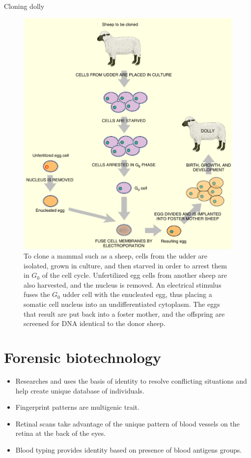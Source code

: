 \documentclass[
  ignorenonframetext,
  aspectratio=169]{beamer}
\providecommand{\tightlist}{%
  \setlength{\itemsep}{0pt}\setlength{\parskip}{0pt}}
\begin{document}
\begin{frame}{Cloning dolly}
\protect\hypertarget{cloning-dolly}{}
\begin{figure}
\includegraphics[width=0.38\linewidth]{../images/dolly_cloning} \caption{To clone a mammal such as a sheep, cells from the udder are isolated, grown in culture, and then starved in order to arrest them in $G_0$ of the cell cycle. Unfertilized egg cells from another sheep are also harvested, and the nucleus is removed. An electrical stimulus fuses the $G_0$ udder cell with the enucleated egg, thus placing a somatic cell nucleus into an undifferentiated cytoplasm. The eggs that result are put back into a foster mother, and the offspring are screened for DNA identical to the donor sheep.}\label{fig:dolly-sheep-cloning}
\end{figure}
\end{frame}

\hypertarget{forensic-biotechnology}{%
\section{Forensic biotechnology}\label{forensic-biotechnology}}

\begin{frame}{}
\protect\hypertarget{section}{}
\begin{itemize}
\tightlist
\item
  Researches and uses the basis of identity to resolve conflicting
  situations and help create unique database of individuals.
\item
  Fingerprint patterns are multigenic trait.
\item
  Retinal scans take advantage of the unique pattern of blood vessels on
  the retina at the back of the eyes.
\item
  Blood typing provides identity based on presence of blood antigens
  groups.
\end{itemize}
\end{frame}
\end{document}
